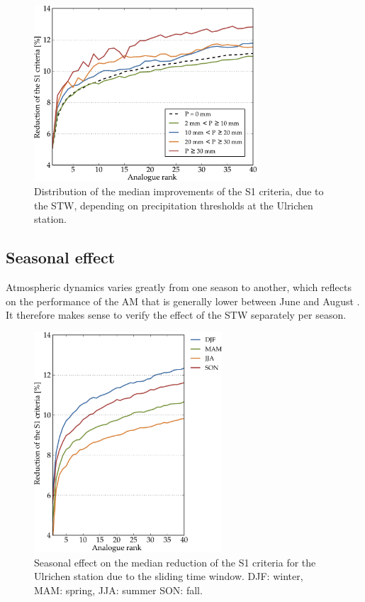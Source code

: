 \documentclass[hess]{copernicus}
\begin{document}
\begin{figure}[htb]
	\begin{center}
		\includegraphics[width=8.3cm]{figures/changes_S1_precip_threshold.pdf}
	\end{center}
	\caption{Distribution of the median improvements of the S1 criteria, due to the STW, depending on precipitation thresholds at the Ulrichen station.}
	\label{fig:changes_S1_precip_threshold}
\end{figure}


\subsection{Seasonal effect}
\label{sec:seasonal_effect}

Atmospheric dynamics varies greatly from one season to another, which reflects on the performance of the AM that is generally lower between June and August \citep{Bliefernicht2010}. It therefore makes sense to verify the effect of the STW separately per season.

\begin{figure}[htb]
	\begin{center}
		\includegraphics[width=7cm]{figures/changes_S1_seasons.pdf}
	\end{center}
	\caption{Seasonal effect on the median reduction of the S1 criteria for the Ulrichen station due to the sliding time window. DJF: winter, MAM: spring, JJA: summer SON: fall.}
	\label{fig:changes_S1_seasons}
\end{figure}
\end{document}
